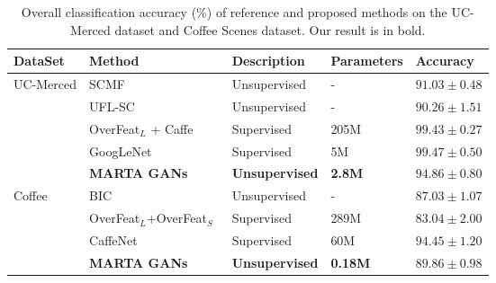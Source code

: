 \documentclass[journal]{IEEEtran}
\begin{document}
\begin{table}[t]
	\centering
	\scriptsize
	\caption{Overall classification accuracy (\%) of reference and proposed methods on the UC-Merced dataset and Coffee Scenes dataset. Our result is in bold.}
	\label{tab:uc_ref}
	
	\begin{tabular}{|p{1.2cm}<{\centering} | p{2.25cm} p{1.2cm} p{0.7cm}<{\centering}  p{1.4cm}<{\centering}|}
		\hline
		 DataSet&Method & Description&Parameters &Accuracy \\
		\hline
		 \multirow{5}{*}{UC-Merced}&SCMF~\cite{sheng2012high}& Unsupervised&- & $91.03\pm0.48$ \\
		&UFL-SC~\cite{hu2015unsupervised}&Unsupervised&-& $90.26\pm1.51$  \\
		&OverFeat$_L$ + Caffe~\cite{penatti2015deep}&Supervised&205M&$99.43\pm0.27$\\
		&GoogLeNet~\cite{nogueira2017towards}&Supervised&5M&$99.47\pm0.50$\\
		&\textbf{MARTA GANs}&\textbf{Unsupervised}&\textbf{2.8M}& \textbf{$94.86\pm0.80$}\\
		\hline
		 \multirow{4}{*}{Coffee}	&BIC~\cite{penatti2015deep}& Unsupervised&- & $87.03\pm1.07$ \\
	&OverFeat$_L$+OverFeat$_S$~\cite{penatti2015deep}&Supervised&289M& $83.04\pm2.00$  \\
		&CaffeNet~\cite{nogueira2017towards}&Supervised&60M& $94.45\pm1.20$  \\
		&\textbf{MARTA GANs}&\textbf{Unsupervised}&\textbf{0.18M}& \textbf{$89.86\pm0.98$}\\
		\hline
	\end{tabular}
\vspace{-1em}
\end{table}
\end{document}

